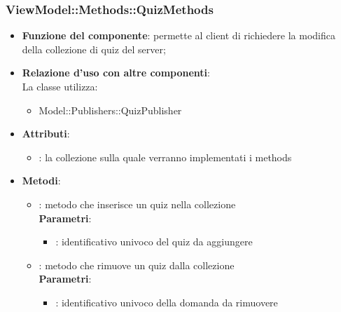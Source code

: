 \subsubsection{ViewModel::Methods::QuizMethods}
\begin{itemize}
\item\textbf{Funzione del componente}: permette al client di richiedere la modifica della collezione di quiz del server;
	\item\textbf{Relazione d'uso con altre componenti}: \\
La classe utilizza:
	\begin{itemize}
		\item Model::Publishers::QuizPublisher
	\end{itemize}
\item\textbf{Attributi}:
	\begin{itemize}
		\item{}: la collezione sulla quale verranno implementati i methods\\
	\end{itemize}
\item\textbf{Metodi}:
	\begin{itemize}
		\item{}: metodo che inserisce un quiz nella collezione\\
		\textbf{Parametri}:
			\begin{itemize}
				\item{}: identificativo univoco del quiz da aggiungere\\
			\end{itemize}
		\item{}: metodo che rimuove un quiz dalla collezione\\
		\textbf{Parametri}:
			\begin{itemize}
				\item{}: identificativo univoco della domanda da rimuovere\\
			\end{itemize}
	\end{itemize}
\end{itemize}

